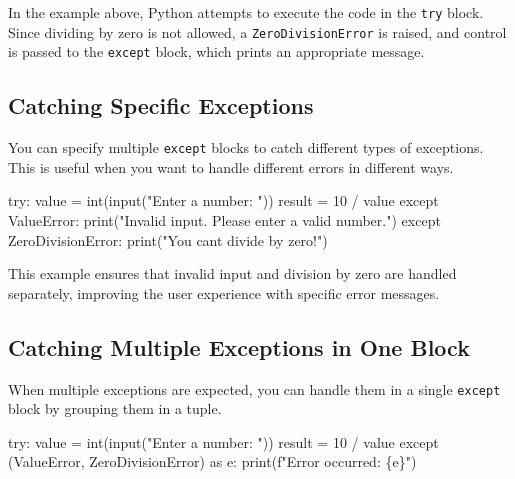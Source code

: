 \documentclass[
  letterpaper,
  DIV=11,
  numbers=noendperiod]{scrreprt}
\newenvironment{Shaded}{\begin{snugshade}}{\end{snugshade}}
\newcommand{\BuiltInTok}[1]{\textcolor[rgb]{0.00,0.23,0.31}{#1}}
\newcommand{\ControlFlowTok}[1]{\textcolor[rgb]{0.00,0.23,0.31}{#1}}
\newcommand{\DecValTok}[1]{\textcolor[rgb]{0.68,0.00,0.00}{#1}}
\newcommand{\ImportTok}[1]{\textcolor[rgb]{0.00,0.46,0.62}{#1}}
\newcommand{\NormalTok}[1]{\textcolor[rgb]{0.00,0.23,0.31}{#1}}
\newcommand{\OperatorTok}[1]{\textcolor[rgb]{0.37,0.37,0.37}{#1}}
\newcommand{\PreprocessorTok}[1]{\textcolor[rgb]{0.68,0.00,0.00}{#1}}
\newcommand{\SpecialCharTok}[1]{\textcolor[rgb]{0.37,0.37,0.37}{#1}}
\newcommand{\SpecialStringTok}[1]{\textcolor[rgb]{0.13,0.47,0.30}{#1}}
\newcommand{\StringTok}[1]{\textcolor[rgb]{0.13,0.47,0.30}{#1}}
\begin{document}
In the example above, Python attempts to execute the code in the
\texttt{try} block. Since dividing by zero is not allowed, a
\texttt{ZeroDivisionError} is raised, and control is passed to the
\texttt{except} block, which prints an appropriate message.

\hypertarget{catching-specific-exceptions}{%
\subsection{Catching Specific
Exceptions}\label{catching-specific-exceptions}}

You can specify multiple \texttt{except} blocks to catch different types
of exceptions. This is useful when you want to handle different errors
in different ways.

\begin{Shaded}
\begin{Highlighting}[]
\ControlFlowTok{try}\NormalTok{:}
\NormalTok{    value }\OperatorTok{=} \BuiltInTok{int}\NormalTok{(}\BuiltInTok{input}\NormalTok{(}\StringTok{"Enter a number: "}\NormalTok{))}
\NormalTok{    result }\OperatorTok{=} \DecValTok{10} \OperatorTok{/}\NormalTok{ value}
\ControlFlowTok{except} \PreprocessorTok{ValueError}\NormalTok{:}
    \BuiltInTok{print}\NormalTok{(}\StringTok{"Invalid input. Please enter a valid number."}\NormalTok{)}
\ControlFlowTok{except} \PreprocessorTok{ZeroDivisionError}\NormalTok{:}
    \BuiltInTok{print}\NormalTok{(}\StringTok{"You can\textquotesingle{}t divide by zero!"}\NormalTok{)}
\end{Highlighting}
\end{Shaded}

This example ensures that invalid input and division by zero are handled
separately, improving the user experience with specific error messages.

\hypertarget{catching-multiple-exceptions-in-one-block}{%
\subsection{Catching Multiple Exceptions in One
Block}\label{catching-multiple-exceptions-in-one-block}}

When multiple exceptions are expected, you can handle them in a single
\texttt{except} block by grouping them in a tuple.

\begin{Shaded}
\begin{Highlighting}[]
\ControlFlowTok{try}\NormalTok{:}
\NormalTok{    value }\OperatorTok{=} \BuiltInTok{int}\NormalTok{(}\BuiltInTok{input}\NormalTok{(}\StringTok{"Enter a number: "}\NormalTok{))}
\NormalTok{    result }\OperatorTok{=} \DecValTok{10} \OperatorTok{/}\NormalTok{ value}
\ControlFlowTok{except}\NormalTok{ (}\PreprocessorTok{ValueError}\NormalTok{, }\PreprocessorTok{ZeroDivisionError}\NormalTok{) }\ImportTok{as}\NormalTok{ e:}
    \BuiltInTok{print}\NormalTok{(}\SpecialStringTok{f"Error occurred: }\SpecialCharTok{\{}\NormalTok{e}\SpecialCharTok{\}}\SpecialStringTok{"}\NormalTok{)}
\end{Highlighting}
\end{Shaded}
\end{document}
